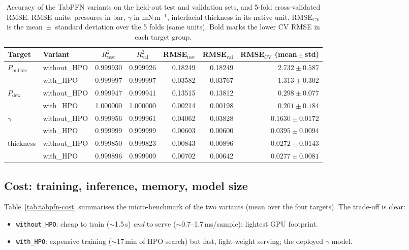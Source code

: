 \documentclass[11pt]{article}
\newcommand{\gmm}{mN\,m$^{-1}$}
\begin{document}
\begin{table}[t]
\centering
\caption{Accuracy of the TabPFN variants on the held-out test and validation
sets, and 5-fold cross-validated RMSE. RMSE units: pressures in bar, $\gamma$ in
\gmm, interfacial thickness in its native unit. RMSE$_\mathrm{CV}$ is the
mean~$\pm$~standard deviation over the 5 folds (same units). Bold marks the
lower CV RMSE in each target group.}
\label{tab:tabpfn-acc}
\small
\begin{tabular}{llrrrrr}
\toprule
Target & Variant & \multicolumn{1}{c}{$R^2_\mathrm{test}$} & \multicolumn{1}{c}{$R^2_\mathrm{val}$}
       & \multicolumn{1}{c}{RMSE$_\mathrm{test}$} & \multicolumn{1}{c}{RMSE$_\mathrm{val}$}
       & \multicolumn{1}{c}{RMSE$_\mathrm{CV}$ (mean\,$\pm$\,std)} \\
\midrule
\multirow{2}{*}{$P_\mathrm{bubble}$}
 & without\_HPO & 0.999930 & 0.999926 & 0.18249 & 0.18249 & $2.732 \pm 0.587$ \\
 & with\_HPO    & 0.999997 & 0.999997 & 0.03582 & 0.03767 & $\mathbf{1.313 \pm 0.302}$ \\
\midrule
\multirow{2}{*}{$P_\mathrm{dew}$}
 & without\_HPO & 0.999947 & 0.999941 & 0.13515 & 0.13812 & $0.298 \pm 0.077$ \\
 & with\_HPO    & 1.000000 & 1.000000 & 0.00214 & 0.00198 & $\mathbf{0.201 \pm 0.184}$ \\
\midrule
\multirow{2}{*}{$\gamma$}
 & without\_HPO & 0.999956 & 0.999961 & 0.04062 & 0.03828 & $0.1630 \pm 0.0172$ \\
 & with\_HPO    & 0.999999 & 0.999999 & 0.00603 & 0.00600 & $\mathbf{0.0395 \pm 0.0094}$ \\
\midrule
\multirow{2}{*}{thickness}
 & without\_HPO & 0.999850 & 0.999823 & 0.00843 & 0.00896 & $\mathbf{0.0272 \pm 0.0143}$ \\
 & with\_HPO    & 0.999896 & 0.999909 & 0.00702 & 0.00642 & $0.0277 \pm 0.0081$ \\
\bottomrule
\end{tabular}
\end{table}

\subsection{Cost: training, inference, memory, model size}
Table~\ref{tab:tabpfn-cost} summarises the micro-benchmark of the two variants
(mean over the four targets). The trade-off is clear:
\begin{itemize}
  \item \texttt{without\_HPO}: cheap to train ($\sim$1.5\,s) \emph{and} to serve
        ($\sim$0.7--1.7\,ms/sample); lightest GPU footprint.
  \item \texttt{with\_HPO}: expensive training ($\sim$17\,min of HPO search) but
        fast, light-weight serving; the deployed $\gamma$ model.
\end{itemize}
\end{document}
